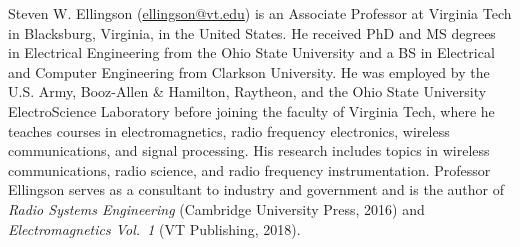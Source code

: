 

\label{m0153_Preface-About_Author} %

Steven W. Ellingson (\href{mailto:ellingson@vt.edu}{ellingson@vt.edu}) is an Associate Professor at Virginia Tech in Blacksburg, Virginia, in the United States. 
He received PhD and MS degrees in Electrical Engineering from the Ohio State University and a BS in Electrical and Computer Engineering from Clarkson University. He was employed by the U.S. Army, Booz-Allen \& Hamilton, Raytheon, and the Ohio State University ElectroScience Laboratory before joining the faculty of Virginia Tech, where he teaches courses in electromagnetics, radio frequency electronics, wireless communications, and signal processing.
His research includes topics in wireless communications, radio science, and radio frequency instrumentation. 
Professor Ellingson serves as a consultant to industry and government and is the author of 
\emph{Radio Systems Engineering} (Cambridge University Press, 2016) and
\emph{Electromagnetics Vol.~1} (VT Publishing, 2018).

